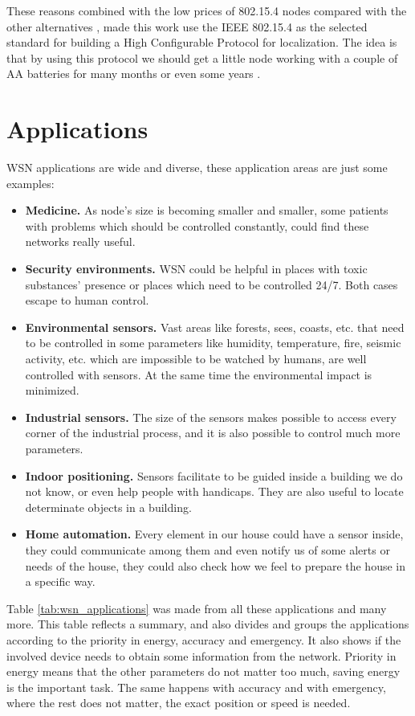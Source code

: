 These reasons combined with the low prices of 802.15.4 nodes compared with the other alternatives \cite{802154Scalability}, made this 
work use the \ac{IEEE} 802.15.4 as the selected standard for building a High Configurable Protocol for localization. The idea is that by 
using this protocol we should get a little node working with a couple of AA batteries for many months or even some years \cite{BatteryDuration}.

\section{Applications}

\ac{WSN} applications are wide and diverse, these application areas are just some examples:

\begin{itemize}
 \item \textbf{Medicine.} As node's size is becoming smaller and smaller, some patients with problems which should be controlled constantly,
could find these networks really useful.
 \item \textbf{Security environments.} \ac{WSN} could be helpful in places with toxic substances' presence or places which need to be controlled
24/7. Both cases escape to human control.
 \item \textbf{Environmental sensors.} Vast areas like forests, sees, coasts, etc. that need to be controlled in some parameters like
humidity, temperature, fire, seismic activity, etc. which are impossible to be watched by humans, are well controlled with sensors. At the same 
time the environmental impact is minimized.
 \item \textbf{Industrial sensors.} The size of the sensors makes possible to access every corner of the industrial process, and it is also
possible to control much more parameters.
 \item \textbf{Indoor positioning.} Sensors facilitate to be guided inside a building we do not know, or even help people with handicaps.
They are also useful to locate determinate objects in a building.
 \item \textbf{Home automation.} Every element in our house could have a sensor inside, they could communicate among them and even notify us
of some alerts or needs of the house, they could also check how we feel to prepare the house in a specific way.
\end{itemize}

Table \ref{tab:wsn_applications} was made from all these applications and many more. This table reflects a summary, and also divides and groups
the applications according to the priority in energy, accuracy and emergency. It also shows if the involved device needs to obtain some information
from the network. Priority in energy means that the other parameters do not matter too much, saving energy is the important task. 
The same happens with accuracy and with emergency, where the rest does not matter, the exact position or speed is needed.


